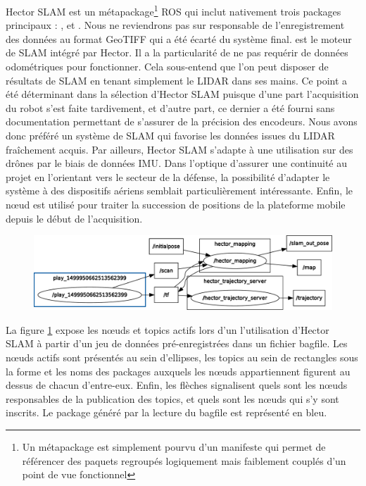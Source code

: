 \gls{Hector SLAM} est un métapackage\footnote{Un métapackage est simplement pourvu d'un manifeste qui permet de référencer des paquets regroupés logiquement mais faiblement couplés d'un point de vue fonctionnel}
\gls{ROS}\cite{Bib_Hector_git} qui inclut nativement trois packages principaux : ,  et . 
Nous ne reviendrons pas sur  responsable de l'enregistrement des données au format \gls{GeoTIFF} qui a été écarté du système final. 
 est le moteur de \gls{SLAM} intégré par Hector. Il a la particularité de ne pas requérir de données odométriques pour fonctionner. 
Cela sous-entend que l'on peut disposer de résultats de SLAM en tenant simplement le LIDAR dans ses mains.
Ce point a été déterminant dans la sélection d'\gls{Hector SLAM} puisque d'une part l'acquisition du robot s'est faite tardivement, 
et d'autre part, ce dernier a été fourni sans documentation permettant de s'assurer de la précision des encodeurs. 
Nous avons donc préféré un système de \gls{SLAM} qui favorise les données issues du \gls{LIDAR} fraîchement acquis. 
Par ailleurs, \gls{Hector SLAM} s'adapte à une utilisation sur des drônes par le biais de données \gls{IMU}. 
Dans l'optique d'assurer une continuité au projet en l'orientant vers le secteur de la défense, la possibilité d'adapter le système à des dispositifs aériens semblait particulièrement intéressante. 
Enfin, le n\oe{}ud  est utilisé pour traiter la succession de positions de la plateforme mobile depuis le début de l'acquisition. 

\begin{figure}[h]
  \centering
    \includegraphics[width=1.\linewidth]{figures/hector_active_nodes}  
  \label{fig:hector}
\end{figure}

La figure \ref{fig:hector} expose les n\oe{}uds et topics actifs lors d'un l'utilisation d'\gls{Hector SLAM} à partir d'un jeu de données pré-enregistrées dans un fichier \gls{bagfile}.
Les n\oe{}uds actifs sont présentés au sein d'ellipses, les topics au sein de rectangles sous la forme  et les noms des packages auxquels les n\oe{}uds appartiennent figurent au dessus de chacun d'entre-eux. 
Enfin, les flèches signalisent quels sont les n\oe{}uds responsables de la publication des topics, et quels sont les n\oe{}uds qui s'y sont inscrits. 
Le package généré par la lecture du \gls{bagfile} est représenté en bleu. 

